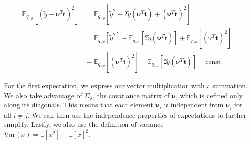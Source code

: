 \documentclass[letterpaper,12pt]{article}
\newcommand{\lp}{\left (} %
\newcommand{\rp}{\right )} %
\newcommand{\lb}{\left [} %
\newcommand{\rb}{\right ]} %
\newcommand{\nuv}{\boldsymbol{\nu}} %
\newcommand{\ytilde}{\ensuremath{\tilde{y}}} %
\newcommand{\ttilde}{\ensuremath{\tilde{\boldsymbol{t}}}} %
\newcommand{\Sigmanu}{\Sigma_{\nuv}} %
\newcommand{\Etheta}{\ensuremath{\mathbb{E}_{q_{-\theta}}}} %
\begin{document}
\begin{equation}
\begin{split}
    \Etheta \lb \lp \ytilde - \nuv^T \ttilde \rp^2 \rb &= \Etheta \lb \ytilde^2 - 2 \ytilde \lp \nuv^T \ttilde \rp + \lp \nuv^T \ttilde \rp^2  \rb \\
    &= \Etheta \lb  \ytilde^2 \rb  - \Etheta \lb  2 \ytilde \lp \nuv^T \ttilde \rp  \rb + \Etheta \lb \lp \nuv^T \ttilde \rp^2 \rb \\
    &= \Etheta \lb \lp \nuv^T \ttilde \rp^2 \rb - \Etheta \lb  2 \ytilde \lp \nuv^T \ttilde \rp  \rb + \textrm{const}
\end{split}
\end{equation}

For the first expectation, we express our vector multiplication with a summation. We also take advantage of $\Sigmanu$, the covariance matrix of $\nuv$, which is defined only along its diagonals. This means that each element $\nuv_i$ is independent from $\nuv_j$ for all $i \neq j$. We can then use the independence properties of expectations to further simplify. Lastly, we also use the definition of variance $\text{Var}(x) = \mathbb{E}\lb x^2 \rb - \mathbb{E} \lb x \rb ^2$. 
\end{document}
